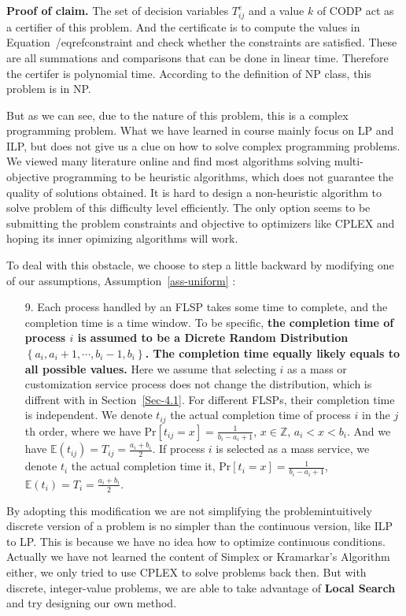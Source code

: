 \documentclass{llncs}
\begin{document}
\textbf{Proof of claim.} The set of decision variables $T_{ij}^e$ and a value $k$ of CODP act as a certifier of this problem. And the certificate is to compute the values in Equation~/eqref{constraint} and check whether the constraints are satisfied. These are all summations and comparisons that can be done in linear time. Therefore the certifer is polynomial time. According to the definition of NP class, this problem is in NP.

But as we can see, due to the nature of this problem, this is a complex programming problem. What we have learned in course mainly focus on LP and ILP, but does not give us a clue on how to solve complex programming problems. We viewed many literature online and find most algorithms solving multi-objective programming to be heuristic algorithms, which does not guarantee the quality of solutions obtained. It is hard to design a non-heuristic algorithm to solve problem of this difficulty level efficiently. The only option seems to be submitting the problem constraints and objective to optimizers like CPLEX and hoping its inner opimizing algorithms will work.

To deal with this obstacle, we choose to step a little backward by modifying one of our assumptions, Assumption~\ref{ass-uniform} :
\begin{enumerate}
    \item[9.] Each process handled by an FLSP takes some time to complete, and the completion time is a time window. To be specific, \textbf{the completion time of process $i$ is assumed to be a Dicrete Random Distribution $\left\{a_i,a_i+1,\cdots,b_i-1,b_i\right\}$. The completion time equally likely equals to all possible values.} Here we assume that selecting $i$ as a mass or customization service process does not change the distribution, which is diffrent with in Section~\ref{Sec-4.1}. For different FLSPs, their completion time is independent. We denote $t_{ij}$ the actual completion time of process $i$ in the $j$th order, where we have Pr$[t_{ij}=x]=\frac{1}{b_i-a_i+1}$, $x\in\mathbb{Z}$, $a_i<x<b_i$. And we have $\mathbb{E}(t_{ij})=T_{ij}=\frac{a_i+b_i}{2}$. If process $i$ is selected as a mass service, we denote $t_{i}$ the actual completion time it, Pr$[t_{i}=x]=\frac{1}{b_i-a_i+1}$, $\mathbb{E}(t_{i})=T_{i}=\frac{a_i+b_i}{2}$.
\end{enumerate}
By adopting this modification we are not simplifying the problem\textemdash intuitively discrete version of a problem is no simpler than the continuous version, like ILP to LP. This is because we have no idea how to optimize continuous conditions. Actually we have not learned the content of Simplex or Kramarkar's Algorithm either, we only tried to use CPLEX to solve problems back then. But with discrete, integer-value problems, we are able to take advantage of \textbf{Local Search} and try designing our own method.
\end{document}
